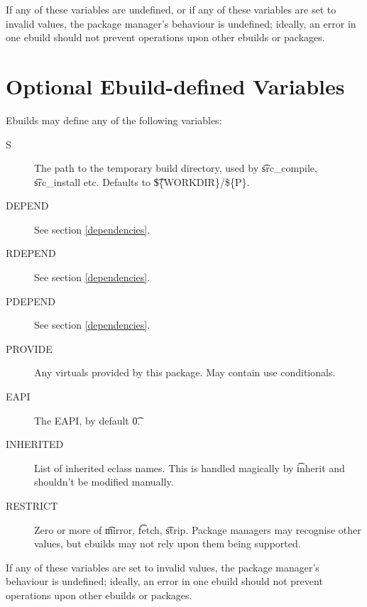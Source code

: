 If any of these variables are undefined, or if any of these variables are set to invalid values,
the package manager's behaviour is undefined; ideally, an error in one ebuild should not prevent
operations upon other ebuilds or packages.

\section{Optional Ebuild-defined Variables}

Ebuilds may define any of the following variables:

\begin{description}
\item[S] The path to the temporary build directory, used by \t{src\_compile}, \t{src\_install}
    etc. Defaults to \t{\$\{WORKDIR\}/\$\{P\}}.
\item[DEPEND] See section \ref{dependencies}.
\item[RDEPEND] See section \ref{dependencies}.
\item[PDEPEND] See section \ref{dependencies}.
\item[PROVIDE] Any  virtuals provided by this package. May contain use conditionals.
\item[EAPI] The EAPI, by default \t{0}.
\item[INHERITED] List of inherited eclass names. This is handled magically by \t{inherit} and
    shouldn't be modified manually.
\item[RESTRICT] Zero or more of \t{mirror}, \t{fetch}, \t{strip}. Package managers may recognise
    other values, but ebuilds may not rely upon them being supported.
\end{description}

If any of these variables are set to invalid values, the package manager's behaviour is undefined;
ideally, an error in one ebuild should not prevent operations upon other ebuilds or packages.


